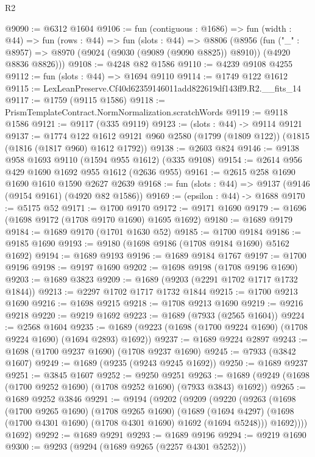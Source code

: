 \begin{lexlean}{R2}
\begin{coremodule}
@9090 := @6312 @1604
@9106 := fun (contiguous : @1686) =>
  fun (width : @44) =>
  fun (rows : @44) =>
  fun (slots : @44) =>
  @8806
    (@8956
      (fun ("_" : @8957) => @8970 (@9024 (@9030 (@9089 (@9090 @8825)) @8910)) (@4920 @8836 @8826)))
@9108 := @4248 @82 @1586
@9110 := @4239 @9108 @4255
@9112 := fun (slots : @44) => @1694 @9110
@9114 := @1749 @122 @1612
@9115 := LexLeanPreserve.Cf40d62359146011add822619df143ff9.R2.__fits_14
@9117 := @1759 (@9115 @1586)
@9118 := PrismTemplateContract.NormNormalization.scratchWords
@9119 := @9118 @1586
@9121 := @9117 (@335 @9119)
@9123 := (slots : @44) -> @9114 @9121
@9137 := @1774
    @122
    @1612
    @9121
    @960
    @2580
    (@1799 (@1809 @122))
    (@1815 (@1816 (@1817 @960) @1612 @1792))
@9138 := @2603 @824
@9146 := @9138 @958 @1693 @9110 (@1594 @955 @1612) (@335 @9108)
@9154 := @2614 @956 @429 @1690 @1692 @955 @1612 (@2636 @955)
@9161 := @2615 @258 @1690 @1690 @1610 @1590 @2627 @2639
@9168 := fun (slots : @44) => @9137 (@9146 (@9154 @9161) (@4920 @82 @1586))
@9169 := (epsilon : @44) -> @1688
@9170 := @5175 @52
@9171 := @1700 @9170
@9172 := @9171 @1690
@9179 := @1696 (@1698 @9172 (@1708 @9170 @1690) @1695 @1692)
@9180 := @1689 @9179
@9184 := @1689 @9170 (@1701 @1630 @52)
@9185 := @1700 @9184
@9186 := @9185 @1690
@9193 := @9180 (@1698 @9186 (@1708 @9184 @1690) @5162 @1692)
@9194 := @1689 @9193
@9196 := @1689 @9184 @1767
@9197 := @1700 @9196
@9198 := @9197 @1690
@9202 := @1698 @9198 (@1708 @9196 @1690)
@9203 := @1689 @3823
@9209 := @1689 (@9203 (@2291 @1702 @1717 @1732 @1844))
@9213 := @2297 @1702 @1717 @1732 @1844
@9215 := @1700 @9213 @1690
@9216 := @1698 @9215
@9218 := @1708 @9213 @1690
@9219 := @9216 @9218
@9220 := @9219 @1692
@9223 := @1689 (@7933 (@2565 @1604))
@9224 := @2568 @1604
@9235 := @1689 (@9223 (@1698 (@1700 @9224 @1690) (@1708 @9224 @1690) (@1694 @2893) @1692))
@9237 := @1689 @9224 @2897
@9243 := @1698 (@1700 @9237 @1690) (@1708 @9237 @1690)
@9245 := @7933 (@3842 @1607)
@9249 := @1689 (@9235 (@9243 @9245 @1692))
@9250 := @1689 @9237
@9251 := @3845 @1607
@9252 := @9250 @9251
@9263 := @1689 (@9249 (@1698 (@1700 @9252 @1690) (@1708 @9252 @1690) (@7933 @3843) @1692))
@9265 := @1689 @9252 @3846
@9291 := @9194
    (@9202
      (@9209
        (@9220
          (@9263
            (@1698
              (@1700 @9265 @1690)
              (@1708 @9265 @1690)
              (@1689
                (@1694 @4297)
                (@1698 (@1700 @4301 @1690) (@1708 @4301 @1690) @1692 (@1694 @5248)))
              @1692))))
      @1692)
@9292 := @1689 @9291
@9293 := @1689 @9196
@9294 := @9219 @1690
@9300 := @9293 (@9294 (@1689 @9265 (@2257 @4301 @5252)))

\end{coremodule}
\end{lexlean}
